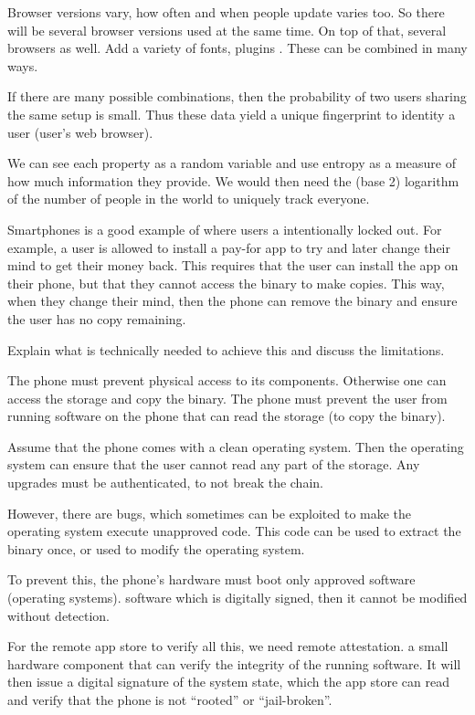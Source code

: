 \begin{solution}
  Browser versions vary, how often and when people update varies too.
  So there will be several browser versions used at the same time.
  On top of that, several browsers as well.
  Add a variety of fonts, plugins \etc.
  These can be combined in many ways.

  If there are many possible combinations, then the probability of two users 
  sharing the same setup is small.
  Thus these data yield a unique fingerprint to identity a user (\ie user's web 
  browser).

  We can see each property as a random variable and use entropy as a measure of 
  how much information they provide.
  We would then need the (base 2) logarithm of the number of people in the world 
  to uniquely track everyone.
\end{solution}
\question[3]
Smartphones is a good example of where users a intentionally locked out.
For example, a user is allowed to install a pay-for app to try and later change 
their mind to get their money back.
This requires that the user can install the app on their phone, but that they 
cannot access the binary to make copies.
This way, when they change their mind, then the phone can remove the binary and 
ensure the user has no copy remaining.

Explain what is technically needed to achieve this and discuss the limitations.

\begin{solution}
  The phone must prevent physical access to its components.
  Otherwise one can access the storage and copy the binary.
  The phone must prevent the user from running software on the phone that can 
  read the storage (to copy the binary).

  Assume that the phone comes with a clean operating system.
  Then the operating system can ensure that the user cannot read any part of 
  the storage.
  Any upgrades must be authenticated, to not break the chain.

  However, there are bugs, which sometimes can be exploited to make the 
  operating system execute unapproved code.
  This code can be used to extract the binary once, or used to modify the 
  operating system.

  To prevent this, the phone's hardware must boot only approved software 
  (operating systems).
  \Ie software which is digitally signed, then it cannot be modified without 
  detection.

  For the remote app store to verify all this, we need remote attestation.
  \Ie a small hardware component that can verify the integrity of the running 
  software.
  It will then issue a digital signature of the system state, which the app 
  store can read and verify that the phone is not \enquote{rooted} or 
  \enquote{jail-broken}.
\end{solution}


